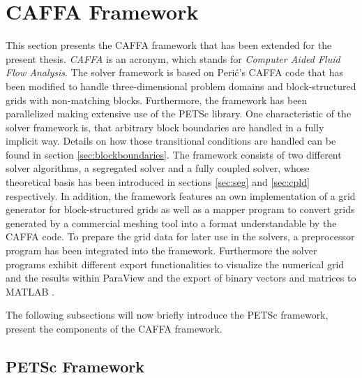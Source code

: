 \section{CAFFA Framework}
\label{sec:caffa}

This section presents the CAFFA framework that has been extended for the present thesis. \emph{CAFFA} is an acronym, which stands for \emph{Computer Aided Fluid Flow Analysis}. The solver framework is based on Peri\'c's CAFFA code \cite{ferziger02} that has been modified to handle three-dimensional problem domains and block-structured grids with non-matching blocks. Furthermore, the framework has been parallelized making extensive use of the PETSc library. One characteristic of the solver framework is, that arbitrary block boundaries are handled in a fully implicit way. Details on how those transitional conditions are handled can be found in section \ref{sec:blockboundaries}. The framework consists of two different solver algorithms, a segregated solver and a fully coupled solver, whose theoretical basis has been introduced in sections \ref{sec:seg} and \ref{sec:cpld} respectively. In addition, the framework features an own implementation of a grid generator for block-structured grids as well as a mapper program to convert grids generated by a commercial meshing tool into a format understandable by the CAFFA code. To prepare the grid data for later use in the solvers, a preprocessor program has been integrated into the framework. Furthermore the solver programs exhibit different export functionalities to visualize the numerical grid and the results within ParaView \cite{paraview} and the export of binary vectors and matrices to MATLAB \textregistered \cite{matlab}.

The following subsections will now briefly introduce the PETSc framework, present the components of the CAFFA framework.

\subsection{PETSc Framework}
\label{sec:petsc}

